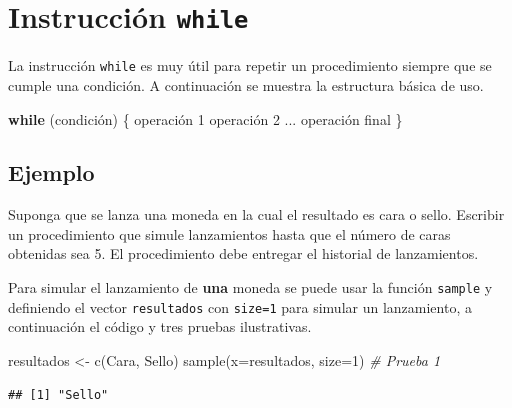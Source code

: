 \documentclass[
]{book}
\makeatletter
\newenvironment{Shaded}{\begin{snugshade}}{\end{snugshade}}
\newcommand{\AttributeTok}[1]{\textcolor[rgb]{0.77,0.63,0.00}{#1}}
\newcommand{\CommentTok}[1]{\textcolor[rgb]{0.56,0.35,0.01}{\textit{#1}}}
\newcommand{\ControlFlowTok}[1]{\textcolor[rgb]{0.13,0.29,0.53}{\textbf{#1}}}
\newcommand{\DecValTok}[1]{\textcolor[rgb]{0.00,0.00,0.81}{#1}}
\newcommand{\FunctionTok}[1]{\textcolor[rgb]{0.00,0.00,0.00}{#1}}
\newcommand{\NormalTok}[1]{#1}
\newcommand{\OtherTok}[1]{\textcolor[rgb]{0.56,0.35,0.01}{#1}}
\newcommand{\StringTok}[1]{\textcolor[rgb]{0.31,0.60,0.02}{#1}}
\newenvironment{kframe}{%
\medskip{}
\setlength{\fboxsep}{.8em}
 \def\at@end@of@kframe{}%
 \ifinner\ifhmode%
  \def\at@end@of@kframe{\end{minipage}}%
  \begin{minipage}{\columnwidth}%
 \fi\fi%
 \def\FrameCommand##1{\hskip\@totalleftmargin \hskip-\fboxsep
 \colorbox{shadecolor}{##1}\hskip-\fboxsep
     \hskip-\linewidth \hskip-\@totalleftmargin \hskip\columnwidth}%
 \MakeFramed {\advance\hsize-\width
   \@totalleftmargin\z@ \linewidth\hsize
   \@setminipage}}%
 {\par\unskip\endMakeFramed%
 \at@end@of@kframe}
\renewenvironment{Shaded}{\begin{kframe}}{\end{kframe}}
\makeatother
\begin{document}
\hypertarget{instrucciuxf3n-while}{%
\section{\texorpdfstring{Instrucción \texttt{while}}{Instrucción while}}\label{instrucciuxf3n-while}}

La instrucción \texttt{while} es muy útil para repetir un procedimiento siempre que se cumple una condición. A continuación se muestra la estructura básica de uso.

\begin{Shaded}
\begin{Highlighting}[]
\ControlFlowTok{while}\NormalTok{ (condición) \{}
\NormalTok{  operación }\DecValTok{1}
\NormalTok{  operación }\DecValTok{2}
\NormalTok{  ...}
\NormalTok{  operación final}
\NormalTok{\}}
\end{Highlighting}
\end{Shaded}

\hypertarget{ejemplo-18}{%
\subsection*{Ejemplo}\label{ejemplo-18}}

Suponga que se lanza una moneda en la cual el resultado es cara o sello. Escribir un procedimiento que simule lanzamientos hasta que el número de caras obtenidas sea 5. El procedimiento debe entregar el historial de lanzamientos.

Para simular el lanzamiento de \textbf{una} moneda se puede usar la función \texttt{sample} y definiendo el vector \texttt{resultados} con \texttt{size=1} para simular un lanzamiento, a continuación el código y tres pruebas ilustrativas.

\begin{Shaded}
\begin{Highlighting}[]
\NormalTok{resultados }\OtherTok{\textless{}{-}} \FunctionTok{c}\NormalTok{(}\StringTok{\textquotesingle{}Cara\textquotesingle{}}\NormalTok{, }\StringTok{\textquotesingle{}Sello\textquotesingle{}}\NormalTok{)}
\FunctionTok{sample}\NormalTok{(}\AttributeTok{x=}\NormalTok{resultados, }\AttributeTok{size=}\DecValTok{1}\NormalTok{)  }\CommentTok{\# Prueba 1}
\end{Highlighting}
\end{Shaded}

\begin{verbatim}
## [1] "Sello"
\end{verbatim}
\end{document}

